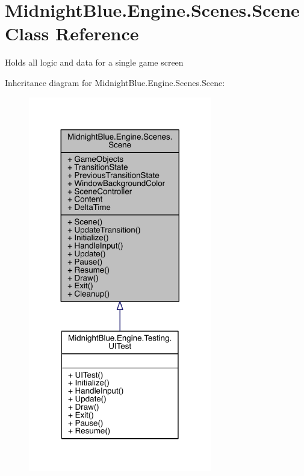 \hypertarget{class_midnight_blue_1_1_engine_1_1_scenes_1_1_scene}{}\section{Midnight\+Blue.\+Engine.\+Scenes.\+Scene Class Reference}
\label{class_midnight_blue_1_1_engine_1_1_scenes_1_1_scene}


Holds all logic and data for a single game screen  




Inheritance diagram for Midnight\+Blue.\+Engine.\+Scenes.\+Scene\+:
\nopagebreak
\begin{figure}[H]
\begin{center}
\leavevmode
\includegraphics[width=227pt]{class_midnight_blue_1_1_engine_1_1_scenes_1_1_scene__inherit__graph}
\end{center}
\end{figure}


